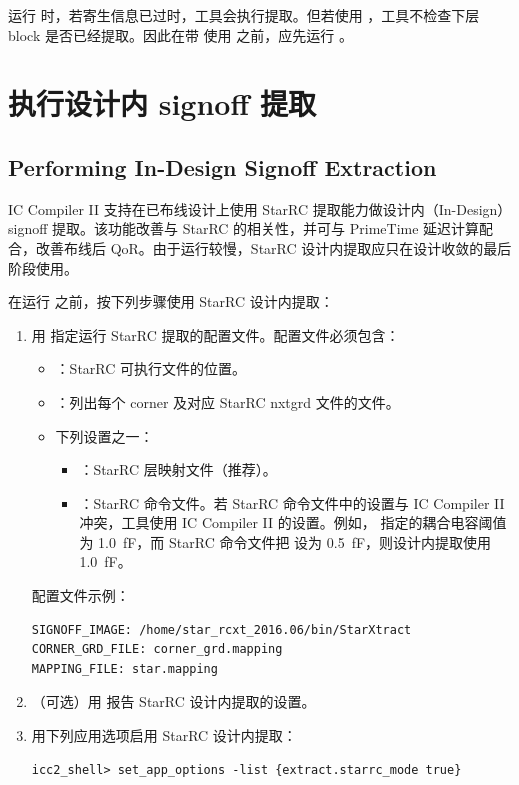 运行  时，若寄生信息已过时，工具会执行提取。但若使用 ，工具不检查下层 block 是否已经提取。因此在带  使用  之前，应先运行 。

\section{执行设计内 signoff 提取}
\subsection*{Performing In-Design Signoff Extraction}

IC Compiler II 支持在已布线设计上使用 StarRC 提取能力做设计内（In-Design）signoff 提取。该功能改善与 StarRC 的相关性，并可与 PrimeTime 延迟计算配合，改善布线后 QoR。由于运行较慢，StarRC 设计内提取应只在设计收敛的最后阶段使用。

在运行  之前，按下列步骤使用 StarRC 设计内提取：
\begin{enumerate}
  \item 用  指定运行 StarRC 提取的配置文件。配置文件必须包含：
  \begin{itemize}
    \item {}：StarRC 可执行文件的位置。
    \item {}：列出每个 corner 及对应 StarRC nxtgrd 文件的文件。
    \item 下列设置之一：
    \begin{itemize}
      \item {}：StarRC 层映射文件（推荐）。
      \item {}：StarRC 命令文件。若 StarRC 命令文件中的设置与 IC Compiler II 冲突，工具使用 IC Compiler II 的设置。例如， 指定的耦合电容阈值为 1.0~fF，而 StarRC 命令文件把  设为 0.5~fF，则设计内提取使用 1.0~fF。
    \end{itemize}
  \end{itemize}
        配置文件示例：
\begin{lstlisting}
SIGNOFF_IMAGE: /home/star_rcxt_2016.06/bin/StarXtract
CORNER_GRD_FILE: corner_grd.mapping
MAPPING_FILE: star.mapping
\end{lstlisting}
  \item （可选）用  报告 StarRC 设计内提取的设置。
  \item 用下列应用选项启用 StarRC 设计内提取：
\begin{lstlisting}
icc2_shell> set_app_options -list {extract.starrc_mode true}
\end{lstlisting}
\end{enumerate}

